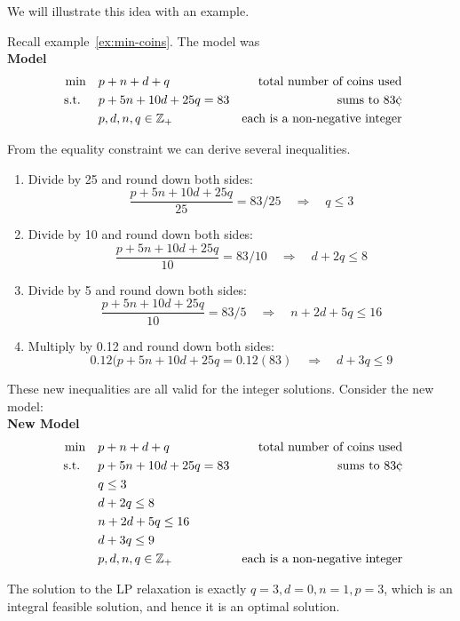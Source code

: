\documentclass[../open-optimization/open-optimization.tex]{subfiles}
\begin{document}
We will illustrate this idea with an example.


\begin{example}{}{}
Recall example~\ref{ex:min-coins}.  The model was\\
\textbf{Model}
\begin{align*}
\min \quad & p + n + d + q & \text{ total number of coins used}\\
\text{ s.t. } \quad & p + 5n + 10d + 25 q = 83 & \text{sums to } 83 \cent\\
& p,d,n,q \in \Z_+ & \text{each is a non-negative integer}
\end{align*}

From the equality constraint we can derive several inequalities.
\begin{enumerate}
\item Divide by 25 and round down both sides:
\[
\frac{p + 5n + 10d + 25 q}{25} = 83/25 \quad \Rightarrow \quad q \leq 3 
\]
\item Divide by 10 and round down both sides:
\[
\frac{p + 5n + 10d + 25 q}{10} = 83/10 \quad \Rightarrow \quad d + 2q \leq 8 
\]
\item Divide by 5 and round down both sides:
\[
\frac{p + 5n + 10d + 25 q}{10} = 83/5 \quad \Rightarrow \quad n + 2d  + 5q \leq 16
\]
\item Multiply by 0.12 and round down both sides:
\[
0.12(p + 5n + 10d + 25 q = 0.12 (83) \quad \Rightarrow \quad d  + 3q \leq 9
\]
\end{enumerate}
These new inequalities are all valid for the integer solutions.  Consider the new model:\\

\textbf{New Model}
\begin{align*}
\min \quad & p + n + d + q & \text{ total number of coins used}\\
\text{ s.t. } \quad & p + 5n + 10d + 25 q = 83 & \text{sums to } 83 \cent\\
& q \leq 3\\
& d + 2q \leq 8 \\
& n + 2d  + 5q \leq 16\\
& d  + 3q \leq 9\\
& p,d,n,q \in \Z_+ & \text{each is a non-negative integer}
\end{align*}

The solution to the LP relaxation is exactly $q = 3, d = 0, n = 1, p = 3$, which is an integral feasible solution, and hence it is an optimal solution.
\end{example}
\end{document}
